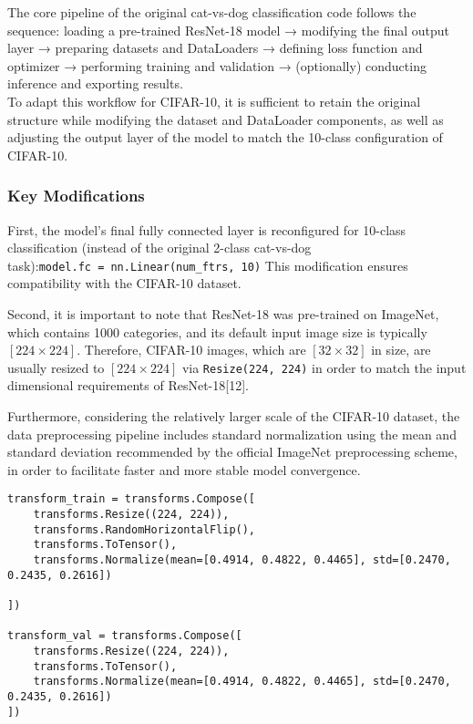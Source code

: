 The core pipeline of the original cat-vs-dog classification code follows
the sequence: loading a pre-trained ResNet-18 model → modifying the
final output layer → preparing datasets and DataLoaders → defining loss
function and optimizer → performing training and validation →
(optionally) conducting inference and exporting results.\\
To adapt this workflow for CIFAR-10, it is sufficient to retain the
original structure while modifying the dataset and DataLoader
components, as well as adjusting the output layer of the model to match
the 10-class configuration of CIFAR-10.

\subsubsection{Key Modifications}\label{key-modifications}

First, the model's final fully connected layer is reconfigured for
10-class classification (instead of the original 2-class cat-vs-dog
task):\texttt{model.fc\ =\ nn.Linear(num\_ftrs,\ 10)} This modification
ensures compatibility with the CIFAR-10 dataset.

Second, it is important to note that ResNet-18 was pre-trained on
ImageNet, which contains 1000 categories, and its default input image
size is typically \([224 \times 224]\). Therefore, CIFAR-10 images,
which are \([32 \times 32]\) in size, are usually resized to
\([224 \times 224]\) via \texttt{Resize(224,\ 224)} in order to match
the input dimensional requirements of ResNet-18{[}12{]}.

Furthermore, considering the relatively larger scale of the CIFAR-10
dataset, the data preprocessing pipeline includes standard normalization
using the mean and standard deviation recommended by the official
ImageNet preprocessing scheme, in order to facilitate faster and more
stable model convergence.

\begin{verbatim}
transform_train = transforms.Compose([
    transforms.Resize((224, 224)),
    transforms.RandomHorizontalFlip(),
    transforms.ToTensor(),
    transforms.Normalize(mean=[0.4914, 0.4822, 0.4465], std=[0.2470, 0.2435, 0.2616])

])

transform_val = transforms.Compose([
    transforms.Resize((224, 224)),
    transforms.ToTensor(),
    transforms.Normalize(mean=[0.4914, 0.4822, 0.4465], std=[0.2470, 0.2435, 0.2616])
])
\end{verbatim}

